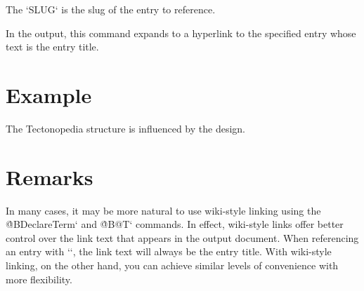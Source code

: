 The \tex`SLUG` is the slug of the entry to reference.

In the output, this command expands to a hyperlink to the specified entry whose
text is the entry title.

\section*{Example}

\begin{texdisp}
The Tectonopedia structure is influenced by the
 design.
\end{texdisp}

\section*{Remarks}

In many cases, it may be more natural to use wiki-style linking using the
\`@BDeclareTerm` and \`@B@T` commands. In effect, wiki-style links offer better
control over the link text that appears in the output document. When referencing
an entry with \tex`\e`, the link text will always be the entry title. With
wiki-style linking, on the other hand, you can achieve similar levels of
convenience with more flexibility.
